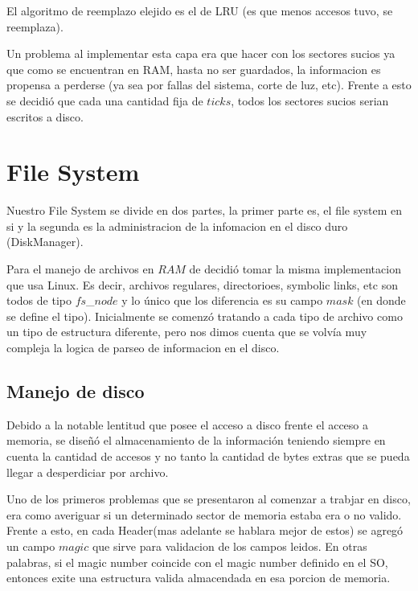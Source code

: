 \documentclass[english]{article}
\begin{document}
El algoritmo de reemplazo elejido es el de LRU (es que menos accesos
tuvo, se reemplaza). 

Un problema al implementar esta capa era que hacer con los sectores
sucios ya que como se encuentran en RAM, hasta no ser guardados, la
informacion es propensa a perderse (ya sea por fallas del sistema,
corte de luz, etc). Frente a esto se decidió que cada una cantidad
fija de $ticks$, todos los sectores sucios serian escritos a disco. 

\pagebreak{}


\section{File System\protect \\
}

Nuestro File System se divide en dos partes, la primer parte es, el
file system en si y la segunda es la administracion de la infomacion
en el disco duro (DiskManager).

Para el manejo de archivos en $RAM$ de decidió tomar la misma implementacion
que usa Linux. Es decir, archivos regulares, directorioes, symbolic
links, etc son todos de tipo $fs$\_$node$ y lo único que los diferencia
es su campo $mask$ (en donde se define el tipo). Inicialmente se
comenzó tratando a cada tipo de archivo como un tipo de estructura
diferente, pero nos dimos cuenta que se volvía muy compleja la logica
de parseo de informacion en el disco.


\subsection{Manejo de disco}

Debido a la notable lentitud que posee el acceso a disco frente el
acceso a memoria, se diseñó el almacenamiento de la información teniendo
siempre en cuenta la cantidad de accesos y no tanto la cantidad de
bytes extras que se pueda llegar a desperdiciar por archivo.

Uno de los primeros problemas que se presentaron al comenzar a trabjar
en disco, era como averiguar si un determinado sector de memoria estaba
era o no valido. Frente a esto, en cada Header(mas adelante se hablara
mejor de estos) se agregó un campo $magic$ que sirve para validacion
de los campos leidos. En otras palabras, si el magic number coincide
con el magic number definido en el SO, entonces exite una estructura
valida almacendada en esa porcion de memoria. \\
\end{document}
